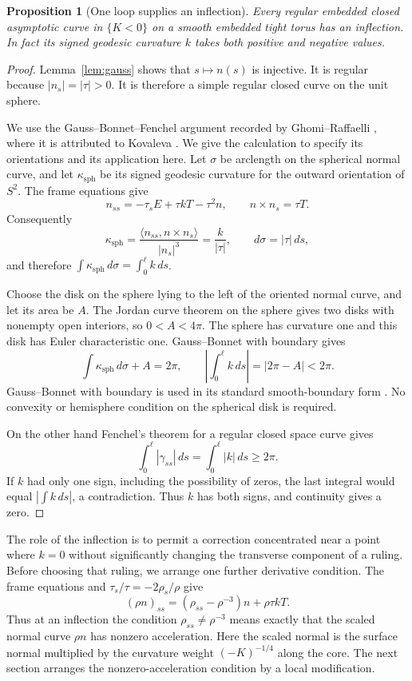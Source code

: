 \documentclass[11pt]{amsart}
\newtheorem{proposition}[theorem]{Proposition}
\theoremstyle{definition}
\begin{document}
\begin{proposition}[One loop supplies an inflection]\label{prop:inflection}
Every regular embedded closed asymptotic curve in $\{K<0\}$ on
a smooth embedded tight torus has an inflection. In fact its
signed geodesic curvature $k$ takes both positive and negative values.
\end{proposition}
\begin{proof}
Lemma~\ref{lem:gauss} shows that $s\mapsto n(s)$ is injective.
It is regular because $|n_s|=|\tau|>0$. It is therefore a simple
regular closed curve on the unit sphere.

We use the Gauss--Bonnet--Fenchel argument recorded by
Ghomi--Raffaelli \cite[Note~5.2, equations~(10)--(12)]{GR}, where
it is attributed to Kovaleva \cite{Kovaleva}. We give the calculation
to specify its orientations and its application here.
Let $\sigma$ be arclength on the spherical normal curve, and
let $\kappa_{\mathrm{sph}}$ be its signed geodesic curvature
for the outward orientation of $S^2$.
The frame equations give
\[
 n_{ss}=-\tau_sE+\tau kT-\tau^2n,\qquad
 n\times n_s=\tau T.
\]
Consequently
\[
 \kappa_{\mathrm{sph}}
 =\frac{\langle n_{ss},n\times n_s\rangle}{|n_s|^3}
 =\frac{k}{|\tau|},\qquad d\sigma=|\tau|\,ds,
\]
and therefore $\int\kappa_{\mathrm{sph}}\,d\sigma=\int_0^\ell k\,ds$.

Choose the disk on the sphere lying to the left of the oriented
normal curve, and let its area be $A$. The Jordan curve theorem
on the sphere gives two disks with nonempty open interiors, so
$0<A<4\pi$. The sphere has curvature one and this disk has Euler
characteristic one. Gauss--Bonnet with boundary gives
\[
 \int\kappa_{\mathrm{sph}}\,d\sigma+A=2\pi,
 \qquad
 \left|\int_0^\ell k\,ds\right|=|2\pi-A|<2\pi .
\]
Gauss--Bonnet with boundary is used in its standard smooth-boundary
form \cite[\S4-5]{doCarmo}. No convexity or hemisphere condition
on the spherical disk is required.

On the other hand Fenchel's theorem \cite{Fenchel} for a regular
closed space curve gives
\[
 \int_0^\ell|\gamma_{ss}|\,ds
 =\int_0^\ell|k|\,ds\ge2\pi.
\]
If $k$ had only one sign, including the possibility of zeros,
the last integral would equal $|\int k\,ds|$, a contradiction.
Thus $k$ has both signs, and continuity gives a zero.
\end{proof}

The role of the inflection is to permit a correction concentrated
near a point where $k=0$ without significantly changing the
transverse component of a ruling. Before choosing that ruling,
we arrange one further derivative condition. The frame
equations and $\tau_s/\tau=-2\rho_s/\rho$ give
\[
 (\rho n)_{ss}=(\rho_{ss}-\rho^{-3})n+\rho\tau kT.
\]
Thus at an inflection the condition
$\rho_{ss}\ne\rho^{-3}$ means exactly that the scaled normal
curve $\rho n$ has nonzero acceleration. Here the scaled normal
is the surface normal multiplied by the curvature weight
$(-K)^{-1/4}$ along the core. The next section arranges the
nonzero-acceleration condition by a local modification.
\end{document}
